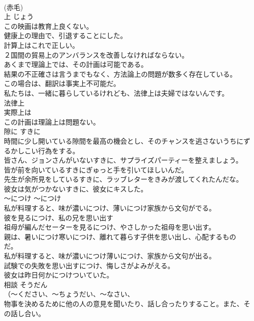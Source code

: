 \documentclass[8pt]{extreport}
\begin{document}
\begin{CJK}{UTF8}{min}
\\	(赤毛)
\\	上	じょう	
\\	この映画は教育上良くない。  
\\	健康上の理由で、引退することにした。  
\\	計算上はこれで正しい。  
\\	２国間の貿易上のアンバランスを改善しなければならない。  
\\	あくまで理論上では、その計画は可能である。  
\\	結果の不正確さは言うまでもなく、方法論上の問題が数多く存在している。  
\\	この場合は、翻訳は事実上不可能だ。  
\\	私たちは、一緒に暮らしているけれども、法律上は夫婦ではないんです。  
\\	法律上  
\\	実際上は   
\\	この計画は理論上は問題ない。  
\\	隙に	すきに	
\\	時間に少し開いている隙間を最高の機会とし、そのチャンスを逃さないうちにずるかしこい行為をする。	
\\	皆さん、ジョンさんがいないすきに、サプライズパーティーを整えましょう。  
\\	皆が前を向いているすきにぎゅっと手を引いてほしいんだ。  
\\	先生が余所見をしているすきに、ラッブレターをきみが渡してくれたんだな。  
\\	彼女は気がつかないすきに、彼女にキスした。  
\\	〜につけ	〜につけ	
\\	私が料理すると、味が濃いにつけ、薄いにつけ家族から文句がでる。  
\\	彼を見るにつけ、私の兄を思い出す  
\\	祖母が編んだセーターを見るにつけ、やさしかった祖母を思い出す。   
\\	親は、暑いにつけ寒いにつけ、離れて暮らす子供を思い出し、心配するものだ。  
\\	私が料理すると、味が濃いにつけ薄いにつけ、家族から文句が出る。  
\\	試験での失敗を思い出すにつけ、悔しさがよみがえる。  
\\	彼女は昨日何かにつけついていた。   
\\	相談	そうだん	
\\	（〜ください、〜ちょうだい、〜なさい、
\\	物事を決めるために他の人の意見を聞いたり、話し合ったりすること。また、その話し合い。	

\end{CJK}
\end{document}
